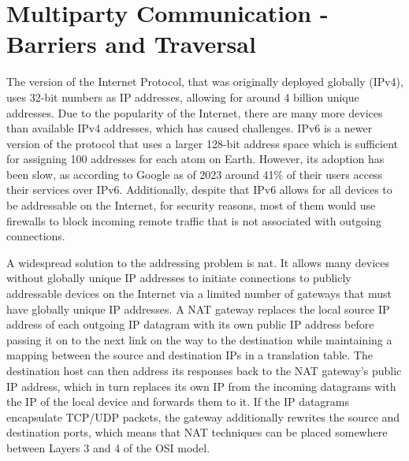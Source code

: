 \hypertarget{multiparty-communication---barriers-and-traversal}{%
\section{Multiparty Communication - Barriers and
Traversal}\label{multiparty-communication---barriers-and-traversal}}

The version of the Internet Protocol, that was originally deployed
globally (IPv4), uses 32-bit numbers as IP addresses, allowing for
around 4 billion unique addresses. Due to the popularity of the
Internet, there are many more devices than available IPv4 addresses,
which has caused challenges. IPv6 is a newer version of the protocol
that uses a larger 128-bit address space which is sufficient for
assigning 100 addresses for each atom on Earth. However, its adoption
has been slow, as according to Google\autocite{IPv6Google} as of 2023
around 41\% of their users access their services over IPv6.
Additionally, despite that IPv6 allows for all devices to be addressable
on the Internet, for security reasons, most of them would use firewalls
to block incoming remote traffic that is not associated with outgoing
connections.

A widespread solution to the addressing problem is \gls{nat}. It allows
many devices without globally unique IP addresses to initiate
connections to publicly addressable devices on the Internet via a
limited number of gateways that must have globally unique IP addresses.
A NAT gateway replaces the local source IP address of each outgoing IP
datagram with its own public IP address before passing it on to the next
link on the way to the destination while maintaining a mapping between
the source and destination IPs in a translation table. The destination
host can then address its responses back to the NAT gateway's public IP
address, which in turn replaces its own IP from the incoming datagrams
with the IP of the local device and forwards them to it. If the IP
datagrams encapsulate TCP/UDP packets, the gateway additionally rewrites
the source and destination ports, which means that NAT techniques can be
placed somewhere between Layers 3 and 4 of the OSI model.

